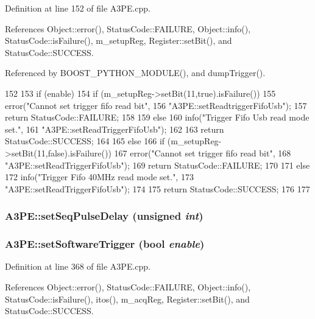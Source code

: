 Definition at line 152 of file A3PE.cpp.

References Object::error(), StatusCode::FAILURE, Object::info(), StatusCode::isFailure(), m\_\-setupReg, Register::setBit(), and StatusCode::SUCCESS.

Referenced by BOOST\_\-PYTHON\_\-MODULE(), and dumpTrigger().


\begin{DoxyCode}
152                                                  {
153   if (enable){
154     if (m_setupReg->setBit(11,true).isFailure()){
155       error("Cannot set trigger fifo read bit",
156           "A3PE::setReadtriggerFifoUsb");
157       return StatusCode::FAILURE;
158     }
159     else {
160       info("Trigger Fifo Usb read mode set.",
161            "A3PE::setReadTriggerFifoUsb");
162     }
163     return StatusCode::SUCCESS;
164   }
165   else {
166     if (m_setupReg->setBit(11,false).isFailure()){
167       error("Cannot set trigger fifo read bit",
168           "A3PE::setReadTriggerFifoUsb");
169       return StatusCode::FAILURE;
170     }
171     else {
172       info("Trigger Fifo 40MHz read mode set.",
173            "A3PE::setReadTriggerFifoUsb");
174     }
175     return StatusCode::SUCCESS;
176   }
177 }
\end{DoxyCode}
\hypertarget{classA3PE_af34831e9776a000f833a610ea999a564}{
\subsubsection[{setSeqPulseDelay}]{ A3PE::setSeqPulseDelay (unsigned {\em int})}}
\label{classA3PE_af34831e9776a000f833a610ea999a564}
\hypertarget{classA3PE_aac0ee532f78885a25eebddbad501417f}{
\subsubsection[{setSoftwareTrigger}]{ A3PE::setSoftwareTrigger (bool {\em enable})}}
\label{classA3PE_aac0ee532f78885a25eebddbad501417f}


Definition at line 368 of file A3PE.cpp.

References Object::error(), StatusCode::FAILURE, Object::info(), StatusCode::isFailure(), itos(), m\_\-acqReg, Register::setBit(), and StatusCode::SUCCESS.

